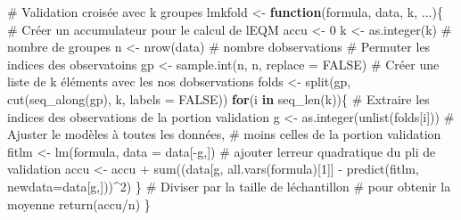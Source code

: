 \documentclass[
  11pt,
  letterpaper,
]{scrbook}
\newenvironment{Shaded}{\begin{snugshade}}{\end{snugshade}}
\newcommand{\AttributeTok}[1]{\textcolor[rgb]{0.40,0.45,0.13}{#1}}
\newcommand{\CommentTok}[1]{\textcolor[rgb]{0.37,0.37,0.37}{#1}}
\newcommand{\ConstantTok}[1]{\textcolor[rgb]{0.56,0.35,0.01}{#1}}
\newcommand{\ControlFlowTok}[1]{\textcolor[rgb]{0.00,0.23,0.31}{\textbf{#1}}}
\newcommand{\DecValTok}[1]{\textcolor[rgb]{0.68,0.00,0.00}{#1}}
\newcommand{\FunctionTok}[1]{\textcolor[rgb]{0.28,0.35,0.67}{#1}}
\newcommand{\NormalTok}[1]{\textcolor[rgb]{0.00,0.23,0.31}{#1}}
\newcommand{\OtherTok}[1]{\textcolor[rgb]{0.00,0.23,0.31}{#1}}
\newcommand{\SpecialCharTok}[1]{\textcolor[rgb]{0.37,0.37,0.37}{#1}}
\theoremstyle{definition}
\theoremstyle{remark}
\begin{document}
\begin{Shaded}
\begin{Highlighting}[]
\CommentTok{\# Validation croisée avec k groupes}
\NormalTok{lmkfold }\OtherTok{\textless{}{-}} \ControlFlowTok{function}\NormalTok{(formula, data, k, ...)\{}
   \CommentTok{\# Créer un accumulateur pour le calcul de l\textquotesingle{}EQM}
\NormalTok{   accu }\OtherTok{\textless{}{-}} \DecValTok{0}
\NormalTok{   k }\OtherTok{\textless{}{-}} \FunctionTok{as.integer}\NormalTok{(k) }\CommentTok{\# nombre de groupes}
\NormalTok{   n }\OtherTok{\textless{}{-}} \FunctionTok{nrow}\NormalTok{(data) }\CommentTok{\# nombre d\textquotesingle{}observations}
   \CommentTok{\# Permuter les indices des observatoins}
\NormalTok{   gp }\OtherTok{\textless{}{-}} \FunctionTok{sample.int}\NormalTok{(n, n, }\AttributeTok{replace =} \ConstantTok{FALSE}\NormalTok{)}
   \CommentTok{\# Créer une liste de k éléments avec les nos d\textquotesingle{}observations}
\NormalTok{   folds }\OtherTok{\textless{}{-}} \FunctionTok{split}\NormalTok{(gp, }\FunctionTok{cut}\NormalTok{(}\FunctionTok{seq\_along}\NormalTok{(gp), k, }\AttributeTok{labels =} \ConstantTok{FALSE}\NormalTok{))}
   \ControlFlowTok{for}\NormalTok{(i }\ControlFlowTok{in} \FunctionTok{seq\_len}\NormalTok{(k))\{}
      \CommentTok{\# Extraire les indices des observations de la portion validation}
\NormalTok{      g }\OtherTok{\textless{}{-}} \FunctionTok{as.integer}\NormalTok{(}\FunctionTok{unlist}\NormalTok{(folds[i]))}
      \CommentTok{\# Ajuster le modèles à toutes les données, }
      \CommentTok{\#  moins celles de la portion validation}
\NormalTok{      fitlm }\OtherTok{\textless{}{-}} \FunctionTok{lm}\NormalTok{(formula, }\AttributeTok{data =}\NormalTok{ data[}\SpecialCharTok{{-}}\NormalTok{g,])}
      \CommentTok{\# ajouter l\textquotesingle{}erreur quadratique du pli de validation}
\NormalTok{      accu }\OtherTok{\textless{}{-}}\NormalTok{ accu }\SpecialCharTok{+} 
          \FunctionTok{sum}\NormalTok{((data[g, }\FunctionTok{all.vars}\NormalTok{(formula)[}\DecValTok{1}\NormalTok{]] }\SpecialCharTok{{-}} 
                \FunctionTok{predict}\NormalTok{(fitlm, }\AttributeTok{newdata=}\NormalTok{data[g,]))}\SpecialCharTok{\^{}}\DecValTok{2}\NormalTok{)}
\NormalTok{   \}}
   \CommentTok{\# Diviser par la taille de l\textquotesingle{}échantillon }
   \CommentTok{\# pour obtenir la moyenne}
   \FunctionTok{return}\NormalTok{(accu}\SpecialCharTok{/}\NormalTok{n)}
\NormalTok{\}}


\end{Highlighting}
\end{Shaded}
\end{document}
